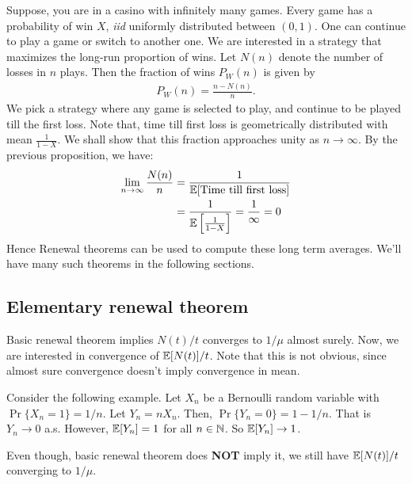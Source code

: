 \documentclass[a4paper,10pt, english]{article}
\begin{document}
\begin{shaded*}
Suppose, you are in a casino with infinitely many games. 
Every game has a probability of win $X$, \textit{iid} uniformly distributed between $(0,1)$. 
One can continue to play a game or switch to another one. We are interested in a strategy that maximizes the long-run proportion of wins.
Let $N(n)$ denote the number of losses in $n$ plays. 
Then the fraction of wins $P_W(n)$ is given by 
\begin{align*}
P_W(n) = \frac{n-N(n)}{n}.
\end{align*}
We pick a strategy where any game is selected to play, and continue to be played till the first loss. Note that, time till first loss is geometrically distributed with mean $\frac{1}{1-X}$. We shall show that this fraction approaches unity as $n \to \infty$. By the previous proposition, we have:
\begin{align*}
\lim_{n \to \infty} \frac{N(n)}{n} &= \frac{1}{\mathbb{E}[\mbox{Time till first loss}]} \\
&= \frac{1}{\mathbb{E}\left[\frac{1}{1-X}\right]} = \frac{1}{\infty} = 0
\end{align*}
Hence Renewal theorems can be used to compute these long term averages. We'll have many such theorems in the following sections.
\end{shaded*}

\subsection{Elementary renewal theorem}
Basic renewal theorem implies $N(t)/t$ converges to $1/\mu$ almost surely. Now, we are interested in convergence of $\mathbb{E}[N(t)]/t$. Note that this is not obvious, since almost sure convergence doesn't imply convergence in mean. 
\begin{shaded*}
Consider the following example. 
Let $X_n$ be a Bernoulli random variable with $\Pr\{X_n = 1\} = 1/n$. 
Let $Y_n = nX_n$. 
Then, $\Pr\{ Y_n = 0 \} = 1 - 1/n$. %
That is $Y_n \to 0$ a.s. However, $\mathbb{E}[Y_n] = 1$ for all $n \in \mathbb{N}$. 
So $\mathbb{E}[Y_n] \to 1$.
\end{shaded*}
Even though, basic renewal theorem does \textbf{NOT} imply it, we still have $\mathbb{E}[N(t)]/t$ converging to $1/\mu$.
\end{document}
